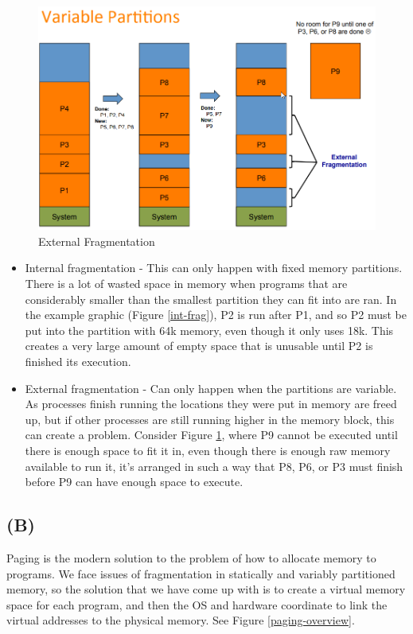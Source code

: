 \documentclass[12pt]{article}
\begin{document}
	\begin{figure}
		\centering
		\includegraphics[width=0.8\columnwidth]{external-fragmentation}
		\caption{External Fragmentation}
		\label{ext-frag}
	\end{figure}

	\begin{itemize}
		\item Internal fragmentation - This can only happen with fixed memory partitions. There is a lot of wasted space in memory when programs that are considerably smaller than the smallest partition they can fit into are ran. In the example graphic (Figure \ref{int-frag}), P2 is run after P1, and so P2 must be put into the partition with 64k memory, even though it only uses 18k. This creates a very large amount of empty space that is unusable until P2 is finished its execution.
		
		\item External fragmentation - Can only happen when the partitions are variable. As processes finish running the locations they were put in memory are freed up, but if other processes are still running higher in the memory block, this can create a problem. Consider Figure \ref{ext-frag}, where P9 cannot be executed until there is enough space to fit it in, even though there is enough raw memory available to run it, it's arranged in such a way that P8, P6, or P3 must finish before P9 can have enough space to execute.
	\end{itemize}

	\subsection*{(B)}
	Paging is the modern solution to the problem of how to allocate memory to programs. We face issues of fragmentation in statically and variably partitioned memory, so the solution that we have come up with is to create a virtual memory space for each program, and then the OS and hardware coordinate to link the virtual addresses to the physical memory. See Figure \ref{paging-overview}.
	
\end{document}

